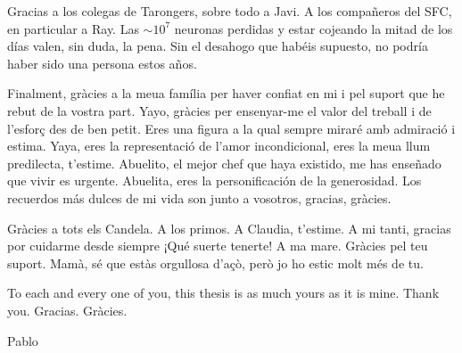 Gracias a los colegas de Tarongers, sobre todo a Javi.
A los compañeros del SFC, en particular a Ray. Las $\sim$$10^7$ neuronas perdidas
y estar cojeando la mitad de los días valen, sin duda, la pena. Sin el desahogo
que habéis supuesto, no podría haber sido una persona estos años.

 
Finalment, gràcies a la meua família per haver confiat en mi i pel suport que he rebut de la vostra part.
Yayo, gràcies per ensenyar-me el valor del treball i de l'esforç des de ben petit.
Eres una figura a la qual sempre miraré amb admiració i estima.
Yaya, eres la representació de l'amor incondicional, eres la meua llum predilecta, t'estime.
Abuelito, el mejor chef que haya existido, me has enseñado que vivir es urgente. 
Abuelita, eres la personificación de la generosidad.
Los recuerdos más dulces de mi vida son junto a vosotros, gracias, gràcies. 

Gràcies a tots els Candela.  A los primos. A Claudia, t'estime.
A mi tanti, gracias por cuidarme desde siempre ¡Qué suerte tenerte! 
A ma mare. Gràcies pel teu suport.
Mamà, sé que estàs orgullosa d'açò, però jo ho estic molt més de tu. 
 





To each and every one of you, this thesis is as much yours as it is mine. Thank you. Gracias. Gràcies.

\hspace*{\fill}  Pablo






